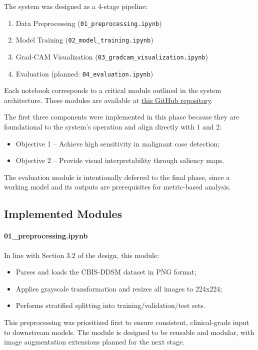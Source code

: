 \documentclass[12pt]{article}
\begin{document}
The system was designed as a 4-stage pipeline:
\begin{enumerate}
    \item Data Preprocessing (\texttt{01\_preprocessing.ipynb})
    \item Model Training (\texttt{02\_model\_training.ipynb})
    \item Grad-CAM Visualization (\texttt{03\_gradcam\_visualization.ipynb})
    \item Evaluation (planned: \texttt{04\_evaluation.ipynb})
\end{enumerate}

Each notebook corresponds to a critical module outlined in the system architecture. These modules are available at \href{https://github.com/justinlim00/FYP-Overview25/tree/main/FYP%20Project/FYP%20Project%20Code%20V1/notebooks}{this GitHub repository}.

The first three components were implemented in this phase because they are foundational to the system's operation and align directly with  1 and 2:
\begin{itemize}
    \item Objective 1 – Achieve high sensitivity in malignant case detection;
    \item Objective 2 – Provide visual interpretability through saliency maps.
\end{itemize}
The evaluation module is intentionally deferred to the final phase, since a working model and its outputs are prerequisites for metric-based analysis.

\subsection{Implemented Modules}

\paragraph{01\_preprocessing.ipynb}
In line with Section 3.2 of the design, this module:
\begin{itemize}
    \item Parses and loads the CBIS-DDSM dataset in PNG format;
    \item Applies grayscale transformation and resizes all images to 224x224;
    \item Performs stratified splitting into training/validation/test sets.
\end{itemize}
This preprocessing was prioritized first to ensure consistent, clinical-grade input to downstream models. The module is designed to be reusable and modular, with image augmentation extensions planned for the next stage.
\end{document}
